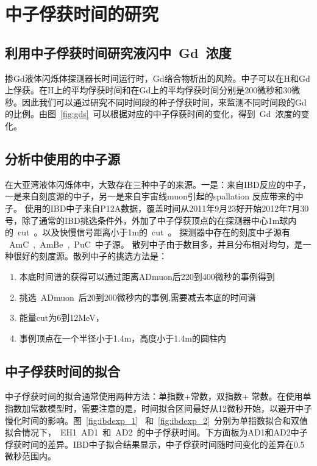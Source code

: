 \section{中子俘获时间的研究}
\subsection{利用中子俘获时间研究液闪中~Gd~浓度}
掺Gd液体闪烁体探测器长时间运行时，Gd络合物析出的风险。中子可以在H和Gd上俘获。在H上的平均俘获时间和在Gd上的平均俘获时间分别是200微秒和30微秒。因此我们可以通过研究不同时间段的种子俘获时间，来监测不同时间段的Gd的比例。由图~\ref{fig:gds}~可以根据对应的中子俘获时间的变化，得到~Gd~浓度的变化。





\subsection{分析中使用的中子源}
在大亚湾液体闪烁体中，大致存在三种中子的来源。一是：来自IBD反应的中子，一是来自刻度源的中子，另一是来自宇宙线muon引起的spallation 反应带来的中子。
使用的IBD中子来自P12A数据，覆盖时间从2011年9月23好开始2012年7月30号，除了通常的IBD挑选条件外，外加了中子俘获顶点的在探测器中心1m球内的~cut~。以及快慢信号距离小于1m的~cut~。
探测器中存在的刻度中子源有 ~AmC~,~AmBe~,~PuC~中子源。
散列中子由于数目多，并且分布相对均匀，是一种很好的刻度源。散列中子的挑选方法是：
 \begin{enumerate}
 \item 本底时间谱的获得可以通过距离ADmuon后220到400微秒的事例得到
 \item 挑选~ADmuon~后20到200微秒内的事例,需要减去本底的时间谱 
 \item 能量cut为6到12MeV，
 \item 事例顶点在一个半径小于1.4m，高度小于1.4m的圆柱内
  \end{enumerate}
\subsection{中子俘获时间的拟合}
中子俘获时间的拟合通常使用两种方法：单指数+常数，双指数+ 常数。在使用单指数加常数模型时，需要注意的是，时间拟合区间最好从12微秒开始，以避开中子慢化时间的影响。图~\ref{fig:ibdexp_1}~ 和~\ref{fig:ibdexp_2}~分别为单指数拟合和双值拟合情况下，~EH1~AD1~和~AD2~的中子俘获时间。下方面板为AD1和AD2中子俘获时间的差异。IBD中子拟合结果显示，中子俘获时间随时间变化的差异在0.5微秒范围内。

